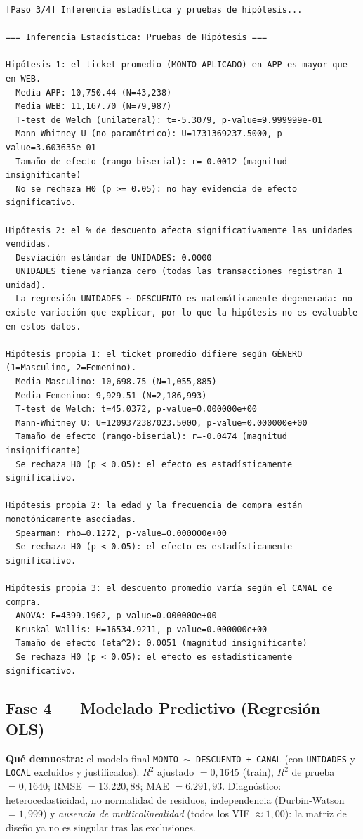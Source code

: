 \documentclass[12pt,letterpaper]{article}
\begin{document}
\begin{Verbatim}[breaklines=true,breakanywhere=true,fontsize=\scriptsize,breaksymbolleft={\tiny\ensuremath{\hookrightarrow}}]
[Paso 3/4] Inferencia estadística y pruebas de hipótesis...

=== Inferencia Estadística: Pruebas de Hipótesis ===

Hipótesis 1: el ticket promedio (MONTO APLICADO) en APP es mayor que en WEB.
  Media APP: 10,750.44 (N=43,238)
  Media WEB: 11,167.70 (N=79,987)
  T-test de Welch (unilateral): t=-5.3079, p-value=9.999999e-01
  Mann-Whitney U (no paramétrico): U=1731369237.5000, p-value=3.603635e-01
  Tamaño de efecto (rango-biserial): r=-0.0012 (magnitud insignificante)
  No se rechaza H0 (p >= 0.05): no hay evidencia de efecto significativo.

Hipótesis 2: el % de descuento afecta significativamente las unidades vendidas.
  Desviación estándar de UNIDADES: 0.0000
  UNIDADES tiene varianza cero (todas las transacciones registran 1 unidad).
  La regresión UNIDADES ~ DESCUENTO es matemáticamente degenerada: no existe variación que explicar, por lo que la hipótesis no es evaluable en estos datos.

Hipótesis propia 1: el ticket promedio difiere según GÉNERO (1=Masculino, 2=Femenino).
  Media Masculino: 10,698.75 (N=1,055,885)
  Media Femenino: 9,929.51 (N=2,186,993)
  T-test de Welch: t=45.0372, p-value=0.000000e+00
  Mann-Whitney U: U=1209372387023.5000, p-value=0.000000e+00
  Tamaño de efecto (rango-biserial): r=-0.0474 (magnitud insignificante)
  Se rechaza H0 (p < 0.05): el efecto es estadísticamente significativo.

Hipótesis propia 2: la edad y la frecuencia de compra están monotónicamente asociadas.
  Spearman: rho=0.1272, p-value=0.000000e+00
  Se rechaza H0 (p < 0.05): el efecto es estadísticamente significativo.

Hipótesis propia 3: el descuento promedio varía según el CANAL de compra.
  ANOVA: F=4399.1962, p-value=0.000000e+00
  Kruskal-Wallis: H=16534.9211, p-value=0.000000e+00
  Tamaño de efecto (eta^2): 0.0051 (magnitud insignificante)
  Se rechaza H0 (p < 0.05): el efecto es estadísticamente significativo.
\end{Verbatim}


\subsection*{Fase 4 --- Modelado Predictivo (Regresión OLS)}
\textbf{Qué demuestra:} el modelo final \texttt{MONTO $\sim$ DESCUENTO + CANAL} (con \texttt{UNIDADES}
y \texttt{LOCAL} excluidos y justificados). $R^2$ ajustado $=0{,}1645$ (train), $R^2$ de prueba
$=0{,}1640$; RMSE $=13.220{,}88$; MAE $=6.291{,}93$. Diagnóstico: heterocedasticidad, no normalidad
de residuos, independencia (Durbin-Watson $=1{,}999$) y \textit{ausencia de multicolinealidad} (todos
los VIF $\approx 1{,}00$): la matriz de diseño ya no es singular tras las exclusiones.
\end{document}
